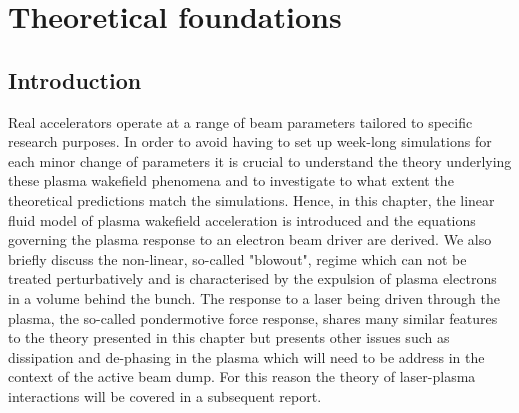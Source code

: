 \chapter{Theoretical foundations}
\section{Introduction}
Real accelerators operate at a range of beam parameters tailored to specific research purposes. In order to avoid having to set up week-long simulations for each minor change of parameters it is crucial to understand the theory underlying these plasma wakefield phenomena and to investigate to what extent the theoretical predictions match the simulations. Hence, in this chapter, the linear fluid model of plasma wakefield acceleration is introduced and  the equations governing the plasma response to an electron beam driver are derived. We also briefly discuss the non-linear, so-called "blowout", regime which can not be treated perturbatively and is characterised by the expulsion of plasma electrons in a volume behind the bunch. The response to a laser being driven through the plasma, the so-called pondermotive force response, shares many similar features to the theory presented in this chapter but presents other issues such as dissipation and de-phasing in the plasma which will need to be address in the context of the active beam dump. For this reason the theory of laser-plasma interactions will be covered in a subsequent report.  %
